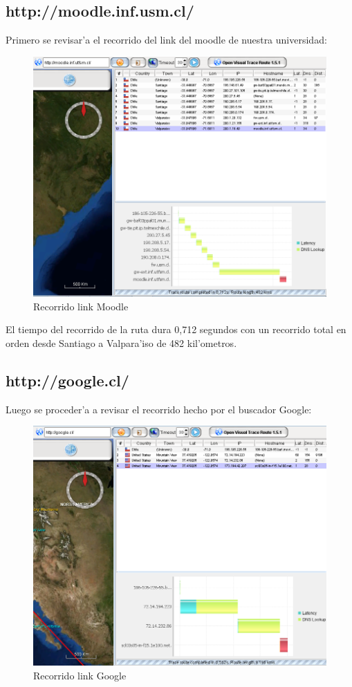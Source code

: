 \documentclass{article}
\begin{document}
\subsection{http://moodle.inf.usm.cl/}
Primero se revisar'a el recorrido del link del moodle de nuestra universidad:
\\
\begin{figure}[H]
  \centering
    \includegraphics[width=1.0\textwidth]{ruta1_moodle}
  \caption{Recorrido link Moodle}
  \label{moodle}
\end{figure}

El tiempo del recorrido de la ruta dura 0,712 segundos con un recorrido total en orden desde Santiago a Valpara'iso de 482 kil'ometros.

\subsection{http://google.cl/}
Luego se proceder'a a revisar el recorrido hecho por el buscador Google:
\\
\begin{figure}[H]
  \centering
    \includegraphics[width=1.0\textwidth]{ruta1_google}
  \caption{Recorrido link Google}
  \label{google}
\end{figure}
\end{document}
